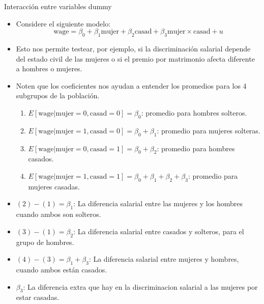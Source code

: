 \documentclass{beamer}
\begin{document}
\begin{frame}[shrink=20, t]{Interacción entre variables dummy}
    \begin{itemize}
        \item Considere el siguiente modelo:
        \begin{equation*}
            \text{wage} = \beta_0 + \beta_1 \text{mujer} + \beta_2 \text{casad} + \beta_3 \text{mujer} \times \text{casad} + u
        \end{equation*}
        \item Esto nos permite testear, por ejemplo, si la discriminación salarial depende del estado civil de las mujeres o si el premio por matrimonio afecta diferente a hombres o mujeres.
        \item Noten que los coeficientes nos ayudan a entender los promedios para los 4 subgrupos de la población.
        \begin{enumerate}
            \item \(E[\text{wage}|\text{mujer} = 0, \text{casad} = 0] = \beta_0\): promedio para hombres solteros.
            \item \(E[\text{wage}|\text{mujer} = 1, \text{casad} = 0] = \beta_0 + \beta_1\): promedio para mujeres solteras.
            \item \(E[\text{wage}|\text{mujer} = 0, \text{casad} = 1] = \beta_0 + \beta_2\): promedio para hombres casados.
            \item \(E[\text{wage}|\text{mujer} = 1, \text{casad} = 1] = \beta_0 + \beta_1 + \beta_2 + \beta_3\): promedio para mujeres casadas.
        \end{enumerate}
        \item \((2) - (1) = \beta_1\): La diferencia salarial entre las mujeres y los hombres cuando ambos son solteros.
        \item \((3) - (1) = \beta_2\): La diferencia salarial entre casados y solteros, para el grupo de hombres.
        \item \((4) - (3) = \beta_1 + \beta_3\): La diferencia salarial entre mujeres y hombres, cuando ambos están casados.
                \item \(\beta_3\): La diferencia extra que hay en la discriminacion salarial a las
mujeres por estar casadas.
    \end{itemize}
\end{frame}
\end{document}
